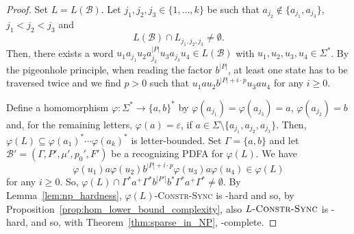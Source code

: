\begin{proof}
 Set $L = L(\mathcal B)$.
 Let $j_1, j_2, j_3 \in \{1,\ldots,k\}$
 be such that $a_{j_2}\notin\{a_{j_1},a_{j_3}\}$, $j_1 < j_2 < j_3$
 and
 \[
  L(\mathcal B) \cap L_{j_1, j_2, j_3} \ne \emptyset.
 \]
 Then, there exists a word $u_1 a_{j_1} u_2 a_{j_2}^{|P|} u_3 a_{j_3} u_4 \in L(\mathcal B)$
 with $u_1, u_2, u_3, u_4 \in \Sigma^*$.
 By the pigeonhole principle, when reading the factor $b^{|P|}$,
 at least one state has to be traversed twice 
 and we find $p > 0$ such that $u_1 a u_2 b^{|P| + i\cdot p} u_3 a u_4$
 for any $i \ge 0$.
 
 
 
 Define a homomorphism $\varphi : \Sigma^* \to \{a,b\}^*$
 by $\varphi(a_{j_1}) = \varphi(a_{j_3}) = a$,
 $\varphi(a_{j_2}) = b$
 and, for the remaining letters, $\varphi(a) = \varepsilon$,
 if $a \in \Sigma \setminus \{a_{j_1}, a_{j_2}, a_{j_3}\}$.
 Then, $\varphi(L) \subseteq \varphi(a_1)^* \cdots \varphi(a_k)^*$
 is letter-bounded. %
 Set $\Gamma = \{a,b\}$ and let $\mathcal B' = (\Gamma, P', \mu', p_0', F')$
 be a recognizing PDFA for $\varphi(L)$.
 We have
 \[
  \varphi(u_1) a \varphi(u_2) b^{|P| + i\cdot p} \varphi(u_3) a \varphi(u_4) \in \varphi(L) 
 \]
 for any $i \ge 0$. So,
 $
 \varphi(L) \cap \Gamma^* a^+ \Gamma^* b^{|P'|}b^* \Gamma^* a^+ \Gamma^* \ne \emptyset.
 $
 By Lemma~\ref{lem:np_hardness}, $\varphi(L)$\textsc{-Constr-Sync}
 is \NP-hard and so, by Proposition~\ref{prop:hom_lower_bound_complexity},
 also $L\textsc{-Constr-Sync}$ is \NP-hard, and so, with Theorem~\ref{thm:sparse_in_NP},
 \NP-complete.
 

\end{proof}
